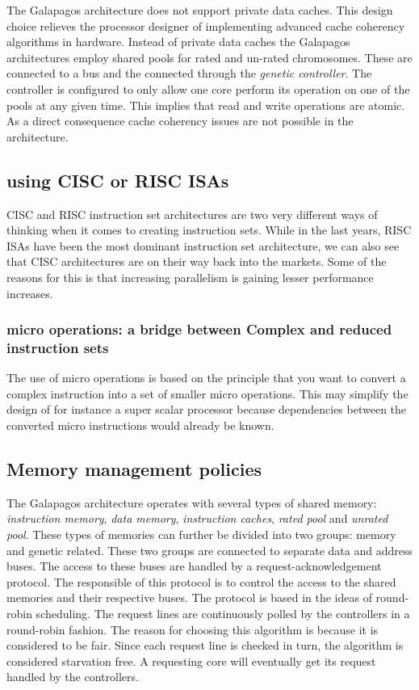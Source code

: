 The Galapagos architecture does not support private data caches. This design choice relieves the processor designer of implementing advanced cache coherency algorithms in hardware. Instead of private data caches the Galapagos architectures employ shared pools for rated and un-rated chromosomes. These are connected to a bus and the connected through the \emph{genetic controller}. The controller is configured to only allow one core perform its operation on one of the pools at any given time. This implies that read and write operations are atomic. As a direct consequence cache coherency issues are not possible in the architecture. 




\subsection{using CISC or RISC ISAs}
CISC and RISC instruction set architectures are two very different ways of thinking when it comes to creating instruction sets.
While in the last years, RISC ISAs have been the most dominant instruction set architecture, we can also see that CISC architectures
are on their way back into the markets. Some of the reasons for this is that increasing parallelism is gaining lesser performance increases.

\subsubsection{micro operations: a bridge between Complex and reduced instruction sets}
The use of micro operations is based on the principle that you want to convert a complex instruction into a set of smaller micro operations. This
may simplify the design of for instance a super scalar processor because dependencies between the converted micro instructions would already be known. 

\subsection{Memory management policies}

The Galapagos architecture operates with several types of shared memory: \emph{instruction memory}, \emph{data memory}, \emph{instruction caches}, \emph{rated pool} and \emph{unrated pool}. These types of memories  can further be divided into two groups: memory and genetic related. These two groups are connected to separate data and address buses. The access to these buses are handled by a request-acknowledgement protocol. The responsible of this protocol is to control the access to the shared memories and their respective buses. The protocol is based in the ideas of round-robin scheduling. The request lines are continuously polled by the controllers in a round-robin fashion. The reason for choosing this algorithm is because it is considered to be fair. Since each request line is checked in turn, the algorithm is considered starvation free. A requesting core will eventually get its request handled by the controllers. 

